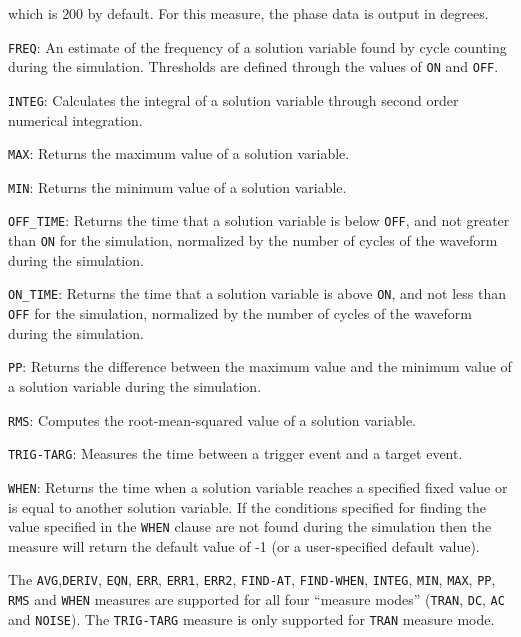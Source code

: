 \begin{XyceItemize}
    which is $200$ by default.  For this measure, the phase data is output in degrees.
  \item \texttt{FREQ}: An estimate of the frequency of a solution variable found by cycle counting
    during the simulation.  Thresholds are defined through the values of \texttt{ON} 
    and \texttt{OFF}.
  \item \texttt{INTEG}: Calculates the integral of a solution variable through second order numerical 
    integration.
  \item \texttt{MAX}: Returns the maximum value of a solution variable.
  \item \texttt{MIN}: Returns the minimum value of a solution variable.
  \item \texttt{OFF\_TIME}: Returns the time that a solution variable is below \texttt{OFF}, and not
    greater than \texttt{ON} for the simulation, normalized by the number of cycles
of the waveform during the simulation.
  \item \texttt{ON\_TIME}: Returns the time that a solution variable is above \texttt{ON}, and not
    less than \texttt{OFF} for the simulation, normalized by the number of cycles
of the waveform during the simulation.
  \item \texttt{PP}: Returns the difference between the maximum value and the minimum value of
    a solution variable during the simulation.
  \item \texttt{RMS}: Computes the root-mean-squared value of a solution variable.
  \item \texttt{TRIG-TARG}: Measures the time between a trigger event and a target event.
  \item \texttt{WHEN}: Returns the time when a solution variable reaches a specified fixed 
    value or is equal to another solution variable.  If the conditions specified for
    finding the value specified in the \texttt{WHEN} clause are not found during the simulation 
    then the measure will return the default value of -1 (or a user-specified default value).
\end{XyceItemize}

The \texttt{AVG},\texttt{DERIV}, \texttt{EQN},   \texttt{ERR},  \texttt{ERR1}, \texttt{ERR2},
\texttt{FIND-AT}, \texttt{FIND-WHEN}, \texttt{INTEG}, \texttt{MIN}, \texttt{MAX}, \texttt{PP},
\texttt{RMS} and \texttt{WHEN} measures are supported for all four ``measure modes'' (\texttt{TRAN},
\texttt{DC}, \texttt{AC} and \texttt{NOISE}).  The \texttt{TRIG-TARG} measure is only supported for
\texttt{TRAN} measure mode.  

